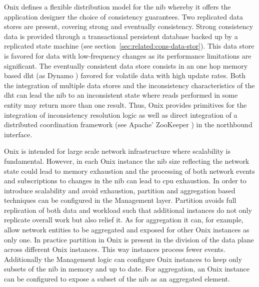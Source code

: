 Onix defines a flexible distribution model for the \gls{nib} whereby  it offers the application designer the choice of consistency guarantees. 
Two replicated data stores are present, covering  strong  and eventually consistency. 
Strong consistency data is provided through a transactional persistent database backed up by a replicated state machine (see section~\ref{sec:related:cons-data-stor}). 
This data store is favored for data with low-frequency changes  as its performance limitations are significant. 
The eventually consistent data store consists in  an one hop memory based \gls{dht}  (as Dynamo  \cite{DeCandia:2007cn}) favored for  volatile data with high update rates. 
Both the integration of multiple data stores and the inconsistency characteristics of the \gls{dht} can lead the \gls{nib} to an inconsistent state where reads performed in some entity may return more than one result. 
Thus, Onix provides primitives for the integration of inconsistency resolution logic as well as  direct integration of a distributed coordination framework (see  Apache' ZooKeeper \cite{Hunt:2010ux}) in the northbound interface. 

Onix is intended for large scale network infrastructure where scalability is fundamental. 
However, in each Onix instance the \gls{nib}  size reflecting the network state could lead to memory exhaustion and the processing of both network events and subscriptions  to changes in  the \gls{nib}  can lead to \gls{cpu} exhaustion.
In order to introduce scalability and avoid exhaustion, partition and aggregation based techniques can be configured in the Management layer. 
Partition avoids full replication of both data  and workload such that additional instances do not only replicate overall work but also relief it. 
As for aggregation it can, for example, allow network entities to be aggregated and exposed for other Onix instances as only one.
In practice partition in Onix is present in the division of the data plane across different Onix instances.  
This way instances process fewer events. 
Additionally the Management logic can configure Onix instances to keep only subsets of the \gls{nib} in memory and up to date. 
For aggregation, an Onix instance can be configured to expose a subset of the \gls{nib} as an aggregated element. 


